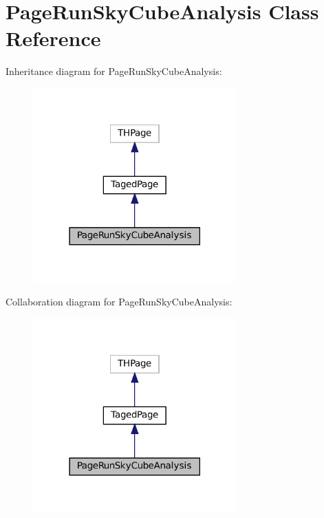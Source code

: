 \hypertarget{class_page_run_sky_cube_analysis}{}\section{Page\+Run\+Sky\+Cube\+Analysis Class Reference}
\label{class_page_run_sky_cube_analysis}


Inheritance diagram for Page\+Run\+Sky\+Cube\+Analysis\+:\nopagebreak
\begin{figure}[H]
\begin{center}
\leavevmode
\includegraphics[width=222pt]{class_page_run_sky_cube_analysis__inherit__graph}
\end{center}
\end{figure}


Collaboration diagram for Page\+Run\+Sky\+Cube\+Analysis\+:\nopagebreak
\begin{figure}[H]
\begin{center}
\leavevmode
\includegraphics[width=222pt]{class_page_run_sky_cube_analysis__coll__graph}
\end{center}
\end{figure}
